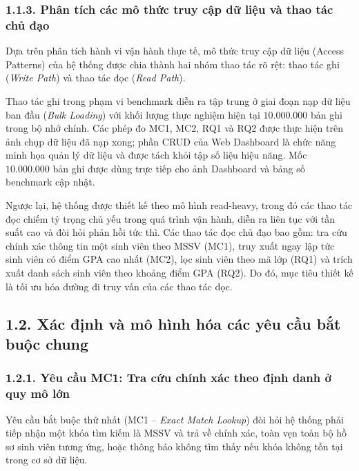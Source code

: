 \documentclass[14pt,a4paper]{extarticle}
\begin{document}
\subsubsection*{1.1.3. Phân tích các mô thức truy cập dữ liệu và thao tác chủ đạo}
{}

Dựa trên phân tích hành vi vận hành thực tế, mô thức truy cập dữ liệu (Access Patterns) của hệ thống được chia thành hai nhóm thao tác rõ rệt: thao tác ghi (\textit{Write Path}) và thao tác đọc (\textit{Read Path}).

Thao tác ghi trong phạm vi benchmark diễn ra tập trung ở giai đoạn nạp dữ liệu ban đầu (\textit{Bulk Loading}) với khối lượng thực nghiệm hiện tại $10.000.000$ bản ghi trong bộ nhớ chính. Các phép đo MC1, MC2, RQ1 và RQ2 được thực hiện trên ảnh chụp dữ liệu đã nạp xong; phần CRUD của Web Dashboard là chức năng minh họa quản lý dữ liệu và được tách khỏi tập số liệu hiệu năng. Mốc $10.000.000$ bản ghi được dùng trực tiếp cho ảnh Dashboard và bảng số benchmark cập nhật.

Ngược lại, hệ thống được thiết kế theo mô hình read-heavy, trong đó các thao tác đọc chiếm tỷ trọng chủ yếu trong quá trình vận hành, diễn ra liên tục với tần suất cao và đòi hỏi phản hồi tức thì. Các thao tác đọc chủ đạo bao gồm: tra cứu chính xác thông tin một sinh viên theo MSSV (MC1), truy xuất ngay lập tức sinh viên có điểm GPA cao nhất (MC2), lọc sinh viên theo mã lớp (RQ1) và trích xuất danh sách sinh viên theo khoảng điểm GPA (RQ2). Do đó, mục tiêu thiết kế là tối ưu hóa đường đi truy vấn của các thao tác đọc.

\subsection*{1.2. Xác định và mô hình hóa các yêu cầu bắt buộc chung}
{}

\subsubsection*{1.2.1. Yêu cầu MC1: Tra cứu chính xác theo định danh ở quy mô lớn}
{}

Yêu cầu bắt buộc thứ nhất (MC1 -- \textit{Exact Match Lookup}) đòi hỏi hệ thống phải tiếp nhận một khóa tìm kiếm là MSSV và trả về chính xác, toàn vẹn toàn bộ hồ sơ sinh viên tương ứng, hoặc thông báo không tìm thấy nếu khóa không tồn tại trong cơ sở dữ liệu.
\end{document}
